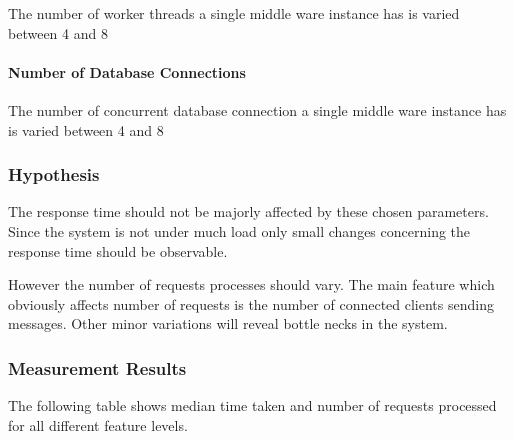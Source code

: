\documentclass[milestone1.tex]{subfiles}
\begin{document}
The number of worker threads a single middle ware instance has is varied between 4 and 8

\paragraph{Number of Database Connections}

The number of concurrent database connection a single middle ware instance has is varied between 4 and 8

\subsubsection{Hypothesis}

The response time should not be majorly affected by these chosen parameters. Since the system is not under much load only small changes concerning the response time should be observable.

However the number of requests processes should vary. The main feature which obviously affects number of requests is the number of connected clients sending messages. Other minor variations will reveal bottle necks in the system.

\subsubsection{Measurement Results}
The following table shows median time taken and number of requests processed for all different feature levels.\\
\end{document}
